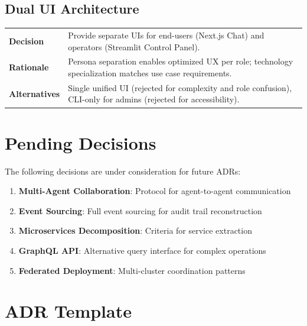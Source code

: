\subsection{Dual UI Architecture}

\begin{table}[ht]
\centering
\small
\begin{tabularx}{\textwidth}{lX}
    \hline
    \textbf{Decision} & Provide separate UIs for end-users (Next.js Chat) and operators (Streamlit Control Panel). \\
    \textbf{Rationale} & Persona separation enables optimized UX per role; technology specialization matches use case requirements. \\
    \textbf{Alternatives} & Single unified UI (rejected for complexity and role confusion), CLI-only for admins (rejected for accessibility). \\
    \hline
\end{tabularx}
\end{table}

\section{Pending Decisions}
\label{app:adr:pending}

The following decisions are under consideration for future ADRs:

\begin{enumerate}
    \item \textbf{Multi-Agent Collaboration}: Protocol for agent-to-agent communication
    \item \textbf{Event Sourcing}: Full event sourcing for audit trail reconstruction
    \item \textbf{Microservices Decomposition}: Criteria for service extraction
    \item \textbf{GraphQL API}: Alternative query interface for complex operations
    \item \textbf{Federated Deployment}: Multi-cluster coordination patterns
\end{enumerate}

\section{ADR Template}
\label{app:adr:template}

